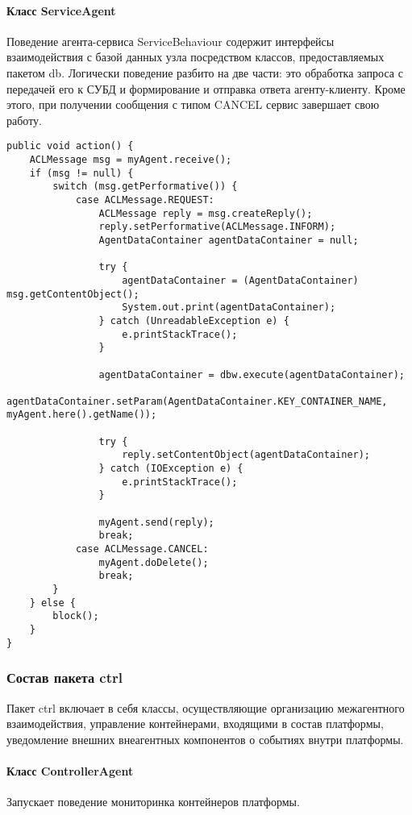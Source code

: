 \paragraph{Класс ServiceAgent}
Поведение агента-сервиса ServiceBehaviour содержит интерфейсы взаимодействия с базой данных узла посредством классов, предоставляемых пакетом db. Логически поведение разбито на две части: это обработка запроса с передачей его к СУБД и формирование и отправка ответа агенту-клиенту. Кроме этого, при получении сообщения с типом CANCEL сервис завершает свою работу.
\begin{verbatim}
public void action() {
    ACLMessage msg = myAgent.receive();
    if (msg != null) {
        switch (msg.getPerformative()) {
            case ACLMessage.REQUEST:
                ACLMessage reply = msg.createReply();
                reply.setPerformative(ACLMessage.INFORM);
                AgentDataContainer agentDataContainer = null;

                try {
                    agentDataContainer = (AgentDataContainer) msg.getContentObject();
                    System.out.print(agentDataContainer);
                } catch (UnreadableException e) {
                    e.printStackTrace();
                }

                agentDataContainer = dbw.execute(agentDataContainer);
                agentDataContainer.setParam(AgentDataContainer.KEY_CONTAINER_NAME, myAgent.here().getName());

                try {
                    reply.setContentObject(agentDataContainer);
                } catch (IOException e) {
                    e.printStackTrace();
                }

                myAgent.send(reply);
                break;
            case ACLMessage.CANCEL:
                myAgent.doDelete();
                break;
        }
    } else {
        block();
    }
}
\end{verbatim}

\subsubsection{Состав пакета ctrl}
Пакет ctrl включает в себя классы, осуществляющие организацию межагентного взаимодействия, управление контейнерами, входящими в состав платформы, уведомление внешних внеагентных компонентов о событиях внутри платформы.
\paragraph{Класс ControllerAgent}
Запускает поведение мониторинка контейнеров платформы.

